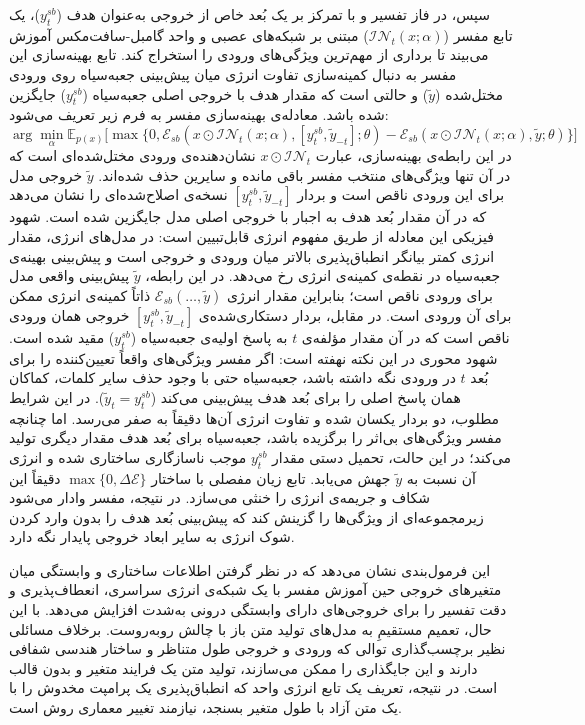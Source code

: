 سپس، در فاز تفسیر و با تمرکز بر یک بُعد خاص از خروجی به‌عنوان هدف ($y_t^{sb}$)، یک تابع مفسر ($\mathcal{IN}_t(x; \alpha)$) مبتنی بر شبکه‌های عصبی و واحد گامبل-سافت‌مکس آموزش می‌بیند تا برداری  از مهم‌ترین ویژگی‌های ورودی را استخراج کند. تابع بهینه‌سازی این مفسر به دنبال کمینه‌سازی تفاوت انرژی میان پیش‌بینی جعبه‌سیاه روی ورودی مختل‌شده ($\tilde{y}$) و حالتی است که مقدار هدف با خروجی اصلی جعبه‌سیاه ($y_t^{sb}$) جایگزین شده باشد. معادله‌ی بهینه‌سازی مفسر به فرم زیر تعریف می‌شود:
\begin{equation}\label{eq:chap3_sointer}
    \arg\min_{\alpha} \mathbb{E}_{p(x)} \Big[ \max \big\{0, \mathcal{E}_{sb}(x \odot \mathcal{IN}_t(x; \alpha), [y_t^{sb}, \tilde{y}_{-t}]; \theta) - \mathcal{E}_{sb}(x \odot \mathcal{IN}_t(x; \alpha), \tilde{y}; \theta) \big\} \Big]
\end{equation}
در این رابطه‌ی بهینه‌سازی، عبارت $x \odot \mathcal{IN}_t$ نشان‌دهنده‌ی ورودی مختل‌شده‌ای است که در آن تنها ویژگی‌های منتخب مفسر باقی مانده و سایرین حذف شده‌اند. $\tilde{y}$ خروجی مدل برای این ورودی ناقص است و بردار $[y_t^{sb}, \tilde{y}_{-t}]$ نسخه‌ی اصلاح‌شده‌ای را نشان می‌دهد که در آن مقدار بُعد هدف به اجبار با خروجی اصلی مدل جایگزین شده است.
شهود فیزیکی این معادله از طریق مفهوم انرژی قابل‌تبیین است: در مدل‌های انرژی، مقدار انرژی کمتر بیانگر انطباق‌پذیری بالاتر میان ورودی و خروجی است و پیش‌بینی بهینه‌ی جعبه‌سیاه در نقطه‌ی کمینه‌ی انرژی رخ می‌دهد.
در این رابطه، $\tilde{y}$ پیش‌بینی واقعی مدل برای ورودی ناقص است؛ بنابراین مقدار انرژی $\mathcal{E}_{sb}(\dots, \tilde{y})$ ذاتاً کمینه‌ی انرژی ممکن برای آن ورودی است. در مقابل، بردار دستکاری‌شده‌ی $[y_t^{sb}, \tilde{y}_{-t}]$ خروجی همان ورودی ناقص است که در آن مقدار مؤلفه‌ی $t$ به پاسخ اولیه‌ی جعبه‌سیاه ($y_t^{sb}$) مقید شده است.
شهود محوری در این نکته نهفته است: اگر مفسر ویژگی‌های واقعاً تعیین‌کننده را برای بُعد $t$ در ورودی نگه داشته باشد، جعبه‌سیاه حتی با وجود حذف سایر کلمات، کماکان همان پاسخ اصلی را برای بُعد هدف پیش‌بینی می‌کند ($\tilde{y}_t = y_t^{sb}$). در این شرایط مطلوب، دو بردار یکسان شده و تفاوت انرژی آن‌ها دقیقاً به صفر می‌رسد. اما چنانچه مفسر ویژگی‌های بی‌اثر را برگزیده باشد، جعبه‌سیاه برای بُعد هدف مقدار دیگری تولید می‌کند؛ در این حالت، تحمیل دستی مقدار $y_t^{sb}$ موجب ناسازگاری ساختاری شده و انرژی آن نسبت به $\tilde{y}$ جهش می‌یابد. تابع زیان مفصلی با ساختار $\max\{0, \Delta \mathcal{E}\}$ دقیقاً این شکاف و جریمه‌ی انرژی را خنثی می‌سازد. در نتیجه، مفسر وادار می‌شود زیرمجموعه‌ای از ویژگی‌ها را گزینش کند که پیش‌بینی بُعد هدف را بدون وارد کردن شوک انرژی به سایر ابعاد خروجی پایدار نگه دارد.

این فرمول‌بندی نشان می‌دهد که در نظر گرفتن اطلاعات ساختاری و وابستگی میان متغیرهای خروجی حین آموزش مفسر با یک شبکه‌ی انرژی سراسری، انعطاف‌پذیری و دقت تفسیر را برای خروجی‌های دارای وابستگی درونی به‌شدت افزایش می‌دهد. با این حال، تعمیم مستقیمِ  به مدل‌های تولید متن باز با چالش روبه‌روست. برخلاف مسائلی نظیر برچسب‌گذاری توالی که ورودی و خروجی طول متناظر و ساختار هندسی شفافی دارند و این جایگذاری را ممکن می‌سازند، تولید متن یک فرایند متغیر و بدون قالب است. در نتیجه، تعریف یک تابع انرژی واحد که انطباق‌پذیری یک پرامپت مخدوش را با یک متن آزاد با طول متغیر بسنجد، نیازمند تغییر معماری روش است.

